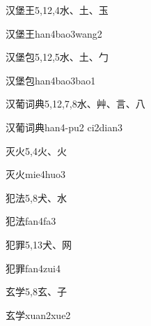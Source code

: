 \begin{entry}{汉堡王}{5,12,4}{⽔、⼟、⽟}
  \begin{phonetics}{汉堡王}{han4bao3wang2}
  \end{phonetics}
\end{entry}

\begin{entry}{汉堡包}{5,12,5}{⽔、⼟、⼓}
  \begin{phonetics}{汉堡包}{han4bao3bao1}
  \end{phonetics}
\end{entry}

\begin{entry}{汉葡词典}{5,12,7,8}{⽔、⾋、⾔、⼋}
  \begin{phonetics}{汉葡词典}{han4-pu2 ci2dian3}
  \end{phonetics}
\end{entry}

\begin{entry}{灭火}{5,4}{⽕、⽕}
  \begin{phonetics}{灭火}{mie4huo3}
  \end{phonetics}
\end{entry}

\begin{entry}{犯法}{5,8}{⽝、⽔}
  \begin{phonetics}{犯法}{fan4fa3}
  \end{phonetics}
\end{entry}

\begin{entry}{犯罪}{5,13}{⽝、⽹}
  \begin{phonetics}{犯罪}{fan4zui4}
  \end{phonetics}
\end{entry}

\begin{entry}{玄学}{5,8}{⽞、⼦}
  \begin{phonetics}{玄学}{xuan2xue2}
  \end{phonetics}
\end{entry}

